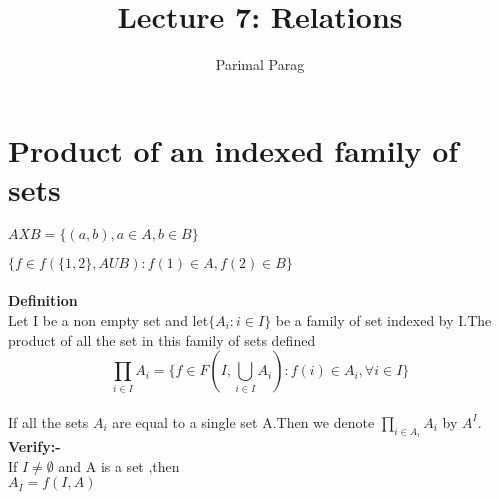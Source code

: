 \documentclass[a4paper,english,12pt]{article}
\title{Lecture 7: Relations}
\author{Parimal Parag}
\begin{document}
\maketitle

\section{Product of an indexed family of sets}
$ AXB = \{(a,b), a \in A , b\in B\}$

$\{f\in f(\{1,2\},AUB):f(1)\in A, f(2)\in B\}$\\\\
\textbf{Definition}\\
Let I be a non empty set and let$\{A_i:i\in I\}$ be a family of set indexed by I.The product of all the set in this family of sets defined 
\begin{equation}
\prod_{i\in I}A_i =\{f\in F(I,\bigcup_{i \in I}A_i):f(i) \in A_i, \forall i \in I\}
\end{equation}\\
If all the sets $A_i$ are equal to a single set A.Then we denote $\prod_{i \in A_i}A_i$ by $A^I$.
\textbf{Verify:-}\\
If $I \neq \emptyset $ and A is a set ,then \\
$A_I =f(I,A)$ 
\end{document}
